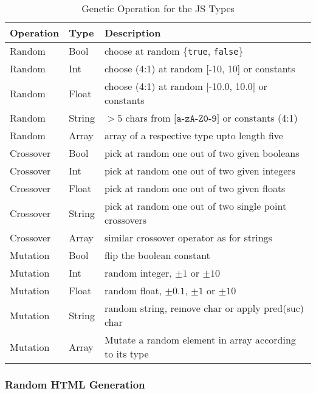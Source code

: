 \begin{table}[!t]
  \caption{Genetic Operation for the JS Types}
  \label{tbl.gen.oper.js.types}
  \scriptsize
  \centering
  \begin{tabular}{p{1cm}|p{5mm}|p{6cm}}
    \toprule
    \textbf{Operation} & \textbf{Type} & \textbf{Description} \\
    \hline
    Random    & Bool   & choose at random \{\texttt{true}, \texttt{false}\} \\
    Random    & Int    & choose (4:1) at random [-10, 10] or constants\\
    Random    & Float  & choose (4:1) at random [-10.0, 10.0] or constants\\
    Random    & String & $>5$ chars from $\texttt{[a-zA-Z0-9]}$ or constants (4:1)\\
    Random    & Array  & array of a respective type upto length five\\
    \hline
    Crossover & Bool   & pick at random one out of two given booleans \\
    Crossover & Int    & pick at random one out of two given integers\\
    Crossover & Float  & pick at random one out of two given floats\\
    Crossover & String & pick at random one out of two single point crossovers\\
    Crossover & Array  & similar crossover operator as for strings\\
    \hline
    Mutation  & Bool   & flip the boolean constant\\
    Mutation  & Int    & random integer, $\pm 1$ or $\pm 10$\\
    Mutation  & Float  & random float, $\pm 0.1$, $\pm 1$ or $\pm 10$\\
    Mutation  & String & random string, remove char or apply pred(suc) char\\
    Mutation  & Array  & Mutate a random element in array according to its type\\
    \bottomrule
  \end{tabular}
\end{table}

\subsubsection{Random HTML Generation}
\label{sub.sub.sec.random.html}


